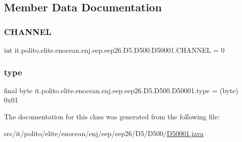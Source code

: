 \subsection{Member Data Documentation}
\hypertarget{classit_1_1polito_1_1elite_1_1enocean_1_1enj_1_1eep_1_1eep26_1_1_d5_1_1_d500_1_1_d50001_ace6f32a83ca186d27d5ca5eea1942bce}{}\label{classit_1_1polito_1_1elite_1_1enocean_1_1enj_1_1eep_1_1eep26_1_1_d5_1_1_d500_1_1_d50001_ace6f32a83ca186d27d5ca5eea1942bce} 
\subsubsection{\texorpdfstring{C\+H\+A\+N\+N\+EL}{CHANNEL}}
{\footnotesize\ttfamily int it.\+polito.\+elite.\+enocean.\+enj.\+eep.\+eep26.\+D5.\+D500.\+D50001.\+C\+H\+A\+N\+N\+EL = 0\hspace{0.3cm}{\ttfamily [static]}}

\hypertarget{classit_1_1polito_1_1elite_1_1enocean_1_1enj_1_1eep_1_1eep26_1_1_d5_1_1_d500_1_1_d50001_a77848ff26d5811baa398eaaba15de97f}{}\label{classit_1_1polito_1_1elite_1_1enocean_1_1enj_1_1eep_1_1eep26_1_1_d5_1_1_d500_1_1_d50001_a77848ff26d5811baa398eaaba15de97f} 
\subsubsection{\texorpdfstring{type}{type}}
{\footnotesize\ttfamily final byte it.\+polito.\+elite.\+enocean.\+enj.\+eep.\+eep26.\+D5.\+D500.\+D50001.\+type = (byte) 0x01\hspace{0.3cm}{\ttfamily [static]}}



The documentation for this class was generated from the following file\+:\begin{DoxyCompactItemize}
\item 
src/it/polito/elite/enocean/enj/eep/eep26/\+D5/\+D500/\hyperlink{_d50001_8java}{D50001.\+java}\end{DoxyCompactItemize}
